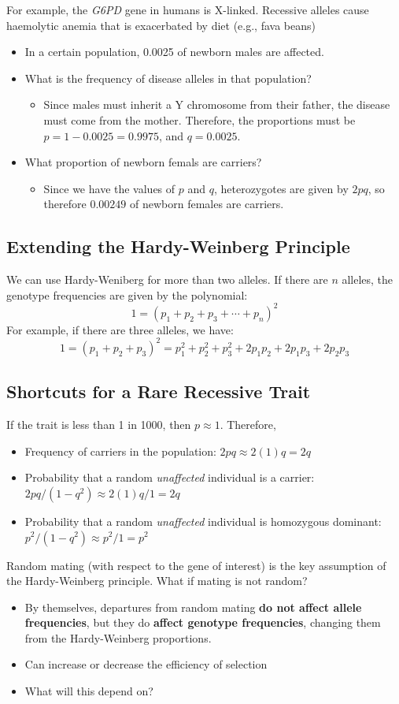 \documentclass[10pt]{article}
\begin{document}
For example, the \textit{G6PD} gene in humans is X-linked.  Recessive alleles cause haemolytic anemia that is exacerbated by diet (e.g., fava beans)
\begin{itemize}
	\item In a certain population, 0.0025 of newborn males are affected.
	\item What is the frequency of disease alleles in that population?
	\begin{itemize}
	    \item Since males must inherit a Y chromosome from their father, the disease must come from the mother.  Therefore, the proportions must be $p = 1 - 0.0025 = 0.9975$, and $q = 0.0025$.
    \end{itemize}
    \item What proportion of newborn femals are carriers?
    \begin{itemize}
	    \item Since we have the values of $p$ and $q$, heterozygotes are given by $2pq$, so therefore $0.00249$ of newborn females are carriers.
    \end{itemize}
\end{itemize}

\subsection*{Extending the Hardy-Weinberg Principle}
We can use Hardy-Weniberg for more than two alleles.  If there are $n$ alleles, the genotype frequencies are given by the polynomial:
\[1 = (p_1 + p_2 + p_3 + \cdots + p_n)^2\]
For example, if there are three alleles, we have:
\[1 = (p_1 + p_2 + p_3)^2 = p_1^2 + p_2^2 + p_3^2 + 2p_1 p_2 + 2p_1 p_3 + 2p_2 p_3\]

\subsection*{Shortcuts for a Rare Recessive Trait}
If the trait is less than 1 in 1000, then $p \approx 1$.  Therefore,
\begin{itemize}
	\item Frequency of carriers in the population: $2pq \approx 2(1)q = 2q$
	\item Probability that a random \textit{unaffected} individual is a carrier: $2pq / (1 - q^2) \approx 2(1)q / 1 = 2q$
	\item Probability that a random \textit{unaffected} individual is homozygous dominant: $p^2 / (1 - q^2) \approx p^2 / 1 = p^2$
\end{itemize}
Random mating (with respect to the gene of interest) is the key assumption of the Hardy-Weinberg principle.  What if mating is not random?
\begin{itemize}
	\item By themselves, departures from random mating \textbf{do not affect allele frequencies}, but they do \textbf{affect genotype frequencies}, changing them from the Hardy-Weinberg proportions.
	\item Can increase or decrease the efficiency of selection
	\item What will this depend on?
\end{itemize}
\end{document}
